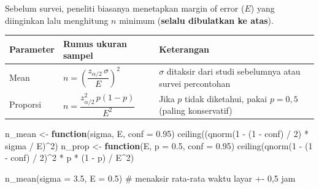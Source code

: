 \documentclass[
  indonesian,
  letterpaper,
]{book}
\newenvironment{Shaded}{\begin{snugshade}}{\end{snugshade}}
\newcommand{\AttributeTok}[1]{\textcolor[rgb]{0.40,0.45,0.13}{#1}}
\newcommand{\CommentTok}[1]{\textcolor[rgb]{0.37,0.37,0.37}{#1}}
\newcommand{\ControlFlowTok}[1]{\textcolor[rgb]{0.00,0.23,0.31}{\textbf{#1}}}
\newcommand{\DecValTok}[1]{\textcolor[rgb]{0.68,0.00,0.00}{#1}}
\newcommand{\FloatTok}[1]{\textcolor[rgb]{0.68,0.00,0.00}{#1}}
\newcommand{\FunctionTok}[1]{\textcolor[rgb]{0.28,0.35,0.67}{#1}}
\newcommand{\NormalTok}[1]{\textcolor[rgb]{0.00,0.23,0.31}{#1}}
\newcommand{\OtherTok}[1]{\textcolor[rgb]{0.00,0.23,0.31}{#1}}
\newcommand{\SpecialCharTok}[1]{\textcolor[rgb]{0.37,0.37,0.37}{#1}}
\newcounter{none} %
\begin{document}
Sebelum survei, peneliti biasanya menetapkan margin of error (\(E\))
yang diinginkan lalu menghitung \(n\) minimum (\textbf{selalu dibulatkan
ke atas}).

{\def\LTcaptype{none} %
\begin{longtable}[]{@{}
  >{\raggedright\arraybackslash}p{}
  >{\raggedright\arraybackslash}p{}
  >{\raggedright\arraybackslash}p{}@{}}
\toprule\noalign{}
\begin{minipage}[b]{\linewidth}\raggedright
Parameter
\end{minipage} & \begin{minipage}[b]{\linewidth}\raggedright
Rumus ukuran sampel
\end{minipage} & \begin{minipage}[b]{\linewidth}\raggedright
Keterangan
\end{minipage} \\
\midrule\noalign{}
\endhead
\bottomrule\noalign{}
\endlastfoot
Mean & \(n = \left(\dfrac{z_{\alpha/2}\,\sigma}{E}\right)^2\) &
\(\sigma\) ditaksir dari studi sebelumnya atau survei percontohan \\
Proporsi & \(n = \dfrac{z_{\alpha/2}^2\,p(1-p)}{E^2}\) & Jika \(p\)
tidak diketahui, pakai \(p = 0{,}5\) (paling konservatif) \\
\end{longtable}
}

\begin{Shaded}
\begin{Highlighting}[]
\NormalTok{n\_mean }\OtherTok{\textless{}{-}} \ControlFlowTok{function}\NormalTok{(sigma, E, }\AttributeTok{conf =} \FloatTok{0.95}\NormalTok{) }\FunctionTok{ceiling}\NormalTok{((}\FunctionTok{qnorm}\NormalTok{(}\DecValTok{1} \SpecialCharTok{{-}}\NormalTok{ (}\DecValTok{1} \SpecialCharTok{{-}}\NormalTok{ conf) }\SpecialCharTok{/} \DecValTok{2}\NormalTok{) }\SpecialCharTok{*}\NormalTok{ sigma }\SpecialCharTok{/}\NormalTok{ E)}\SpecialCharTok{\^{}}\DecValTok{2}\NormalTok{)}
\NormalTok{n\_prop }\OtherTok{\textless{}{-}} \ControlFlowTok{function}\NormalTok{(E, }\AttributeTok{p =} \FloatTok{0.5}\NormalTok{, }\AttributeTok{conf =} \FloatTok{0.95}\NormalTok{) }\FunctionTok{ceiling}\NormalTok{(}\FunctionTok{qnorm}\NormalTok{(}\DecValTok{1} \SpecialCharTok{{-}}\NormalTok{ (}\DecValTok{1} \SpecialCharTok{{-}}\NormalTok{ conf) }\SpecialCharTok{/} \DecValTok{2}\NormalTok{)}\SpecialCharTok{\^{}}\DecValTok{2} \SpecialCharTok{*}\NormalTok{ p }\SpecialCharTok{*}\NormalTok{ (}\DecValTok{1} \SpecialCharTok{{-}}\NormalTok{ p) }\SpecialCharTok{/}\NormalTok{ E}\SpecialCharTok{\^{}}\DecValTok{2}\NormalTok{)}

\FunctionTok{n\_mean}\NormalTok{(}\AttributeTok{sigma =} \FloatTok{3.5}\NormalTok{, }\AttributeTok{E =} \FloatTok{0.5}\NormalTok{)    }\CommentTok{\# menaksir rata{-}rata waktu layar +{-} 0,5 jam}
\end{Highlighting}
\end{Shaded}
\end{document}
